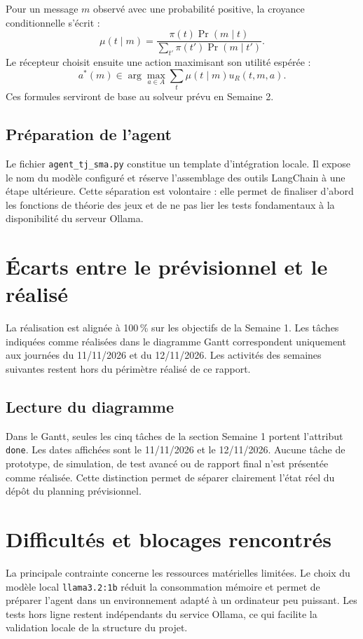 \documentclass[11pt,a4paper]{article}
\begin{document}
Pour un message $m$ observé avec une probabilité positive, la croyance
conditionnelle s'écrit :
\[
\mu(t\mid m)=
\frac{\pi(t)\Pr(m\mid t)}
{\sum_{t'}\pi(t')\Pr(m\mid t')}.
\]
Le récepteur choisit ensuite une action maximisant son utilité espérée :
\[
a^*(m)\in\arg\max_{a\in A}
\sum_t \mu(t\mid m)u_R(t,m,a).
\]
Ces formules serviront de base au solveur prévu en Semaine 2.

\subsection{Préparation de l'agent}

Le fichier \texttt{agent\_tj\_sma.py} constitue un template d'intégration
locale. Il expose le nom du modèle configuré et réserve l'assemblage des outils
LangChain à une étape ultérieure. Cette séparation est volontaire : elle
permet de finaliser d'abord les fonctions de théorie des jeux et de ne pas
lier les tests fondamentaux à la disponibilité du serveur Ollama.

\section{Écarts entre le prévisionnel et le réalisé}

La réalisation est alignée à 100\,\% sur les objectifs de la Semaine 1.
Les tâches indiquées comme réalisées dans le diagramme Gantt correspondent
uniquement aux journées du 11/11/2026 et du 12/11/2026. Les activités des
semaines suivantes restent hors du périmètre réalisé de ce rapport.

\subsection{Lecture du diagramme}

Dans le Gantt, seules les cinq tâches de la section Semaine 1 portent
l'attribut \texttt{done}. Les dates affichées sont le 11/11/2026 et le
12/11/2026. Aucune tâche de prototype, de simulation, de test avancé ou de
rapport final n'est présentée comme réalisée. Cette distinction permet de
séparer clairement l'état réel du dépôt du planning prévisionnel.

\section{Difficultés et blocages rencontrés}

La principale contrainte concerne les ressources matérielles limitées. Le choix
du modèle local \texttt{llama3.2:1b} réduit la consommation mémoire et permet
de préparer l'agent dans un environnement adapté à un ordinateur peu puissant.
Les tests hors ligne restent indépendants du service Ollama, ce qui facilite
la validation locale de la structure du projet.
\end{document}
